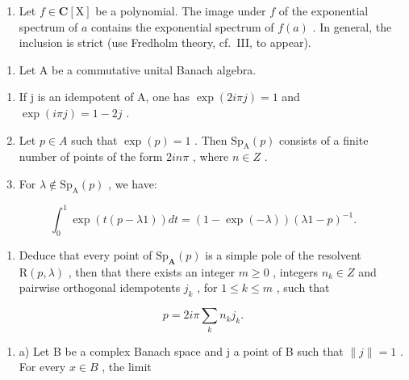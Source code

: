 \begin{enumerate}
\def\labelenumi{\alph{enumi})}
\setcounter{enumi}{3}
\tightlist
\item
  Let \(f\in \mathbf{C}[\mathrm{X}]\) be a polynomial. The image under \(f\) of the exponential spectrum of \(a\) contains the exponential spectrum of \(f(a)\) . In general, the inclusion is strict (use Fredholm theory, cf.~III, to appear).
\end{enumerate}

\begin{enumerate}
\def\labelenumi{\arabic{enumi})}
\setcounter{enumi}{5}
\tightlist
\item
  Let A be a commutative unital Banach algebra.
\end{enumerate}

\begin{enumerate}
\def\labelenumi{\alph{enumi})}
\item
  If j is an idempotent of A, one has \(\exp(2i\pi j)=1\) and \(\exp(i\pi j)=1-2j\) .
\item
  Let \(p \in A\) such that \(\exp(p) = 1\) . Then \(\mathrm{Sp}_{\mathrm{A}}(p)\) consists of a finite number of points of the form \(2in\pi\) , where \(n \in Z\) .
\item
  For \(\lambda \notin \mathrm{Sp}_{\mathrm{A}}(p)\) , we have:
\end{enumerate}

\[
\int_ {0} ^ {1} \exp (t (p - \lambda 1)) d t = (1 - \exp (- \lambda)) (\lambda 1 - p) ^ {- 1}.
\]

\begin{enumerate}
\def\labelenumi{\alph{enumi})}
\setcounter{enumi}{3}
\tightlist
\item
  Deduce that every point of \(\mathrm{Sp}_{\mathbf{A}}(p)\) is a simple pole of the resolvent \(\mathrm{R}(p,\lambda)\) , then that there exists an integer \(m \geqslant 0\) , integers \(n_{k} \in Z\) and pairwise orthogonal idempotents \(j_{k}\) , for \(1 \leqslant k \leqslant m\) , such that
\end{enumerate}

\[
p = 2 i \pi \sum_ {k} n _ {k} j _ {k}.
\]

\begin{enumerate}
\def\labelenumi{¶ \arabic{enumi})}
\setcounter{enumi}{6}
\tightlist
\item
  a) Let B be a complex Banach space and j a point of B such that \(\|j\| = 1\) . For every \(x \in B\) , the limit
\end{enumerate}

